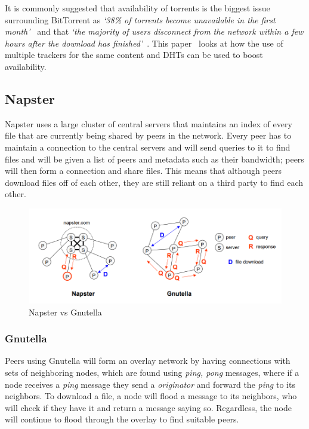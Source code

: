 \vspace{2mm}
\noindent It is commonly suggested that availability of torrents is the biggest issue surrounding BitTorrent as \textit{`38\% of torrents become unavailable in the first month'}~\cite{kaune_unraveling_2010} and that \textit{`the majority of users disconnect from the network within a few hours after the download has finished'}~\cite{pouwelse_bittorrent_2005}.
This paper~\cite{neglia_availability_2007} looks at how the use of multiple trackers for the same content and DHTs can be used to boost availability.

\subsection{Napster}

Napster uses a large cluster of central servers that maintains an index of every file that are currently being shared by peers in the network. Every peer has to maintain a connection to the central servers and will send queries to it to find files and will be given a list of peers and metadata such as their bandwidth; peers will then form a connection and share files. This means that although peers download files off of each other, they are still reliant on a third party to find each other.

\begin{center}
  \begin{figure}[ht]
    \includegraphics[width=.9\textwidth]{diagrams/napster-vs-gnutella.png}
    \caption{Napster vs Gnutella~\cite[Figure 1]{saroiu_measurement_2001}}
  \end{figure}
\end{center}

\subsubsection{Gnutella}

Peers using Gnutella will form an overlay network by having connections with sets of neighboring nodes, which are found using \textit{ping, pong} messages, where if a node receives a \textit{ping} message they send a \textit{originator} and forward the \textit{ping} to its neighbors. To download a file, a node will flood a message to its neighbors, who will check if they have it and return a message saying so. Regardless, the node will continue to flood through the overlay to find suitable peers.